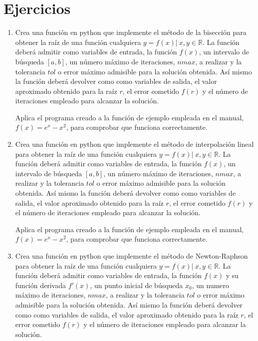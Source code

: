 \section{Ejercicios}
\begin{enumerate}
\item Crea una función en python que implemente el método de  la bisección para obtener la raíz de una función cualquiera $y = f(x)\vert\  x, y \in \mathbb{R}$. La función deberá admitir como variables de entrada, la función $f(x)$, un intervalo de búsqueda $[a,b]$, un número máximo de iteraciones, $nmax$, a realizar y la tolerancia $tol$ o error máximo admisible para la solución obtenida. Así mismo la función deberá devolver como como variables de salida, el valor aproximado obtenido para la raíz $r$, el error cometido $f(r)$ y el número de iteraciones empleado para alcanzar la solución. 

Aplica el programa creado a la función de ejemplo empleada en el manual, $f(x) = e^x-x^2$, para comprobar que funciona correctamente.

\item Crea una función en python que implemente el método de  interpolación lineal para obtener la raíz de una función cualquiera $y = f(x)\vert\  x, y \in \mathbb{R}$. La función deberá admitir como variables de entrada, la función $f(x)$, un intervalo de búsqueda $[a,b]$, un número máximo de iteraciones, $nmax$, a realizar y la tolerancia $tol$ o error máximo admisible para la solución obtenida. Así mismo la función deberá devolver como como variables de salida, el valor aproximado obtenido para la raíz $r$, el error cometido $f(r)$ y el número de iteraciones empleado para alcanzar la solución.

Aplica el programa creado a la función de ejemplo empleada en el manual, $f(x) = e^x-x^2$, para comprobar que funciona correctamente.

\item Crea una función en python que implemente el método de  Newton-Raphson para obtener la raíz de una función cualquiera $y = f(x)\vert\  x, y \in \mathbb{R}$. La función deberá admitir como variables de entrada, la función $f(x)$ y su función derivada $f'(x)$, un punto inicial de búsqueda $x_0$, un numero máximo de iteraciones, $nmax$, a realizar y la tolerancia $tol$ o error máximo admisible para la solución obtenida. Así mismo la función deberá devolver como como variables de salida, el valor aproximado obtenido para la raíz $r$, el error cometido $f(r)$ y el número de iteraciones empleado para alcanzar la solución.


\end{enumerate}

